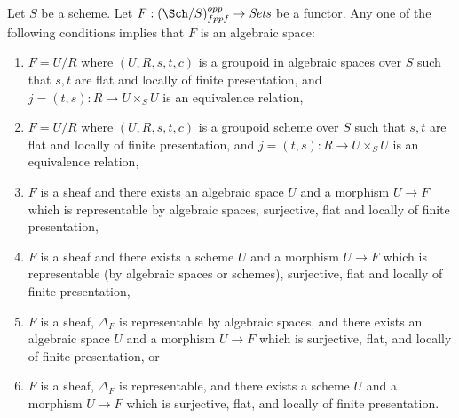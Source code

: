 \begin{theorem}
\label{theorem-final-bootstrap}
Let $S$ be a scheme.
Let $F : (\Sch/S)_{fppf}^{opp} \to \textit{Sets}$ be a functor.
Any one of the following conditions implies that $F$ is an algebraic space:
\begin{enumerate}
\item $F = U/R$ where $(U, R, s, t, c)$ is a groupoid in algebraic spaces
over $S$ such that $s, t$ are flat and locally of finite presentation, and
$j = (t, s) : R \to U \times_S U$ is an equivalence relation,
\item $F = U/R$ where $(U, R, s, t, c)$ is a groupoid scheme
over $S$ such that $s, t$ are flat and locally of finite presentation, and
$j = (t, s) : R \to U \times_S U$ is an equivalence relation,
\item $F$ is a sheaf and there exists an algebraic space $U$ and a morphism
$U \to F$ which is representable by algebraic spaces,
surjective, flat and locally of finite presentation,
\item $F$ is a sheaf and there exists a scheme $U$ and a morphism
$U \to F$ which is representable (by algebraic spaces or schemes),
surjective, flat and locally of finite presentation,
\item $F$ is a sheaf, $\Delta_F$ is representable by algebraic spaces,
and there exists an algebraic space $U$ and a morphism $U \to F$ which is
surjective, flat, and locally of finite presentation, or
\item $F$ is a sheaf, $\Delta_F$ is representable,
and there exists a scheme $U$ and a morphism $U \to F$ which is
surjective, flat, and locally of finite presentation.
\end{enumerate}
\end{theorem}

